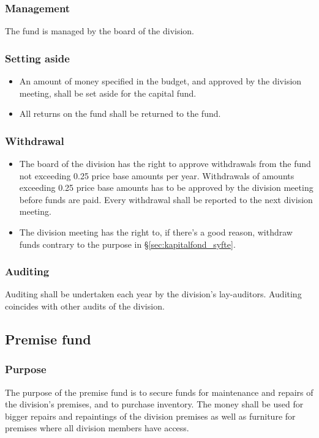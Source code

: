 \documentclass[a4paper]{dtek}
\begin{document}
\subsubsection{Management}
The fund is managed by the board of the division.

\subsubsection{Setting aside}
\begin{itemize}
    \item An amount of money specified in the budget, and approved by the division meeting, shall be set aside for the capital fund.
    \item All returns on the fund shall be returned to the fund.
\end{itemize}
\subsubsection{Withdrawal}
\begin{itemize}
    \item The board of the division has the right to approve withdrawals from the fund not exceeding 0.25 price base amounts per year. Withdrawals of amounts exceeding 0.25 price base amounts has to be approved by the division meeting before funds are paid. Every withdrawal shall be reported to the next division meeting.
    \item The division meeting has the right to, if there's a good reason, withdraw funds contrary to the purpose in §\ref{sec:kapitalfond_syfte}.
\end{itemize}
\subsubsection{Auditing}
Auditing shall be undertaken each year by the division's lay-auditors. Auditing coincides with other audits of the division.

\subsection{Premise fund}
\subsubsection{Purpose}
\label{sec:lokalfond_syfte}
The purpose of the premise fund is to secure funds for maintenance and repairs of the division's premises, and to purchase inventory. The money shall be used for bigger repairs and repaintings of the division premises as well as furniture for premises where all division members have access.
\end{document}
